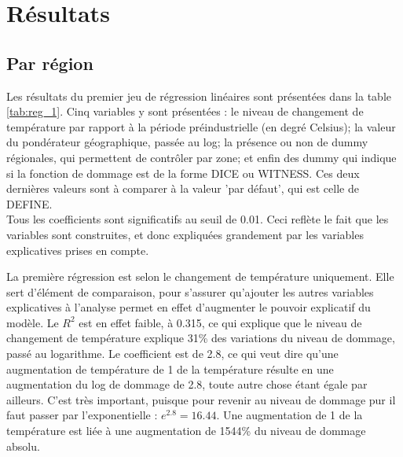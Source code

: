 \section{Résultats}

\subsection{Par région}

\begin{table}
    \centering
     \resizebox{\textwidth}{!}{}
     \label{tab:reg_1}
\end{table}

Les résultats du premier jeu de régression linéaires sont présentées dans la table \ref{tab:reg_1}. Cinq variables y sont présentées : le niveau de changement de température par rapport à la période préindustrielle (en degré Celsius); la valeur du pondérateur géographique, passée au log; la présence ou non de dummy régionales, qui permettent de contrôler par zone; et enfin des dummy qui indique si la fonction de dommage est de la forme DICE ou WITNESS. Ces deux dernières valeurs sont à comparer à la valeur 'par défaut', qui est celle de DEFINE. \\

Tous les coefficients sont significatifs au seuil de 0.01. Ceci reflète le fait que les variables sont construites, et donc expliquées grandement par les variables explicatives prises en compte. 

La première régression est selon le changement de température uniquement. Elle sert d'élément de comparaison, pour s'assurer qu'ajouter les autres variables explicatives à l'analyse permet en effet d'augmenter le pouvoir explicatif du modèle. Le $R^2$ est en effet faible, à 0.315, ce qui explique que le niveau de changement de température explique 31\% des variations du niveau de dommage, passé au logarithme. Le coefficient est de 2.8, ce qui veut dire qu'une augmentation de température de 1 \textdegree de la température résulte en une augmentation du log de dommage de 2.8, toute autre chose étant égale par ailleurs. C'est très important, puisque pour revenir au niveau de dommage pur il faut passer par l'exponentielle : $e^{2.8}=16.44$. Une augmentation de 1 \textdegree de la température est liée à une augmentation de 1544\% du niveau de dommage absolu. \\




